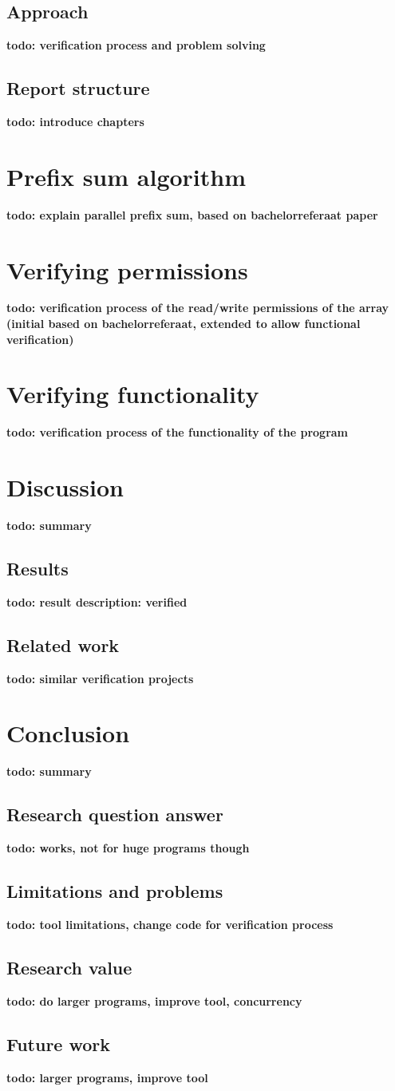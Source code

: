 \documentclass[a4paper]{article}
\newcommand{\todo}[1]{{\color{BurntOrange}\sffamily\textbf{todo: #1}\par}}
\begin{document}
\subsection{Approach}
\todo{verification process and problem solving}

\subsection{Report structure}
\todo{introduce chapters}


\section{Prefix sum algorithm}
\todo{explain parallel prefix sum, based on bachelorreferaat paper}


\section{Verifying permissions}
\todo{verification process of the read/write permissions of the array (initial based on bachelorreferaat, extended to allow functional verification)}


\section{Verifying functionality}
\todo{verification process of the functionality of the program}


\section{Discussion}
\todo{summary}

\subsection{Results}
\todo{result description: verified}

\subsection{Related work}
\todo{similar verification projects}


\section{Conclusion}
\todo{summary}

\subsection{Research question answer}
\todo{works, not for huge programs though}

\subsection{Limitations and problems}
\todo{tool limitations, change code for verification process}

\subsection{Research value}
\todo{do larger programs, improve tool, concurrency}

\subsection{Future work}
\todo{larger programs, improve tool}




\end{document}
